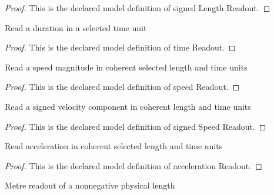 \begin{proof}
  This is the declared model definition of signed Length Readout.
\end{proof}
\begin{definition}
  \label{def:physics:phyx-mini-0739:phyxminiproblems-problemphyxmini0739-timereadout}
  Read a duration in a selected time unit
\end{definition}
\begin{proof}
  This is the declared model definition of time Readout.
\end{proof}
\begin{definition}
  \label{def:physics:phyx-mini-0739:phyxminiproblems-problemphyxmini0739-speedreadout}
  Read a speed magnitude in coherent selected length and time units
\end{definition}
\begin{proof}
  This is the declared model definition of speed Readout.
\end{proof}
\begin{definition}
  \label{def:physics:phyx-mini-0739:phyxminiproblems-problemphyxmini0739-signedspeedreadout}
  Read a signed velocity component in coherent length and time units
\end{definition}
\begin{proof}
  This is the declared model definition of signed Speed Readout.
\end{proof}
\begin{definition}
  \label{def:physics:phyx-mini-0739:phyxminiproblems-problemphyxmini0739-accelerationreadout}
  Read acceleration in coherent selected length and time units
\end{definition}
\begin{proof}
  This is the declared model definition of acceleration Readout.
\end{proof}
\begin{definition}
  \label{def:physics:phyx-mini-0739:phyxminiproblems-problemphyxmini0739-lengthinmeters}
  Metre readout of a nonnegative physical length
\end{definition}
